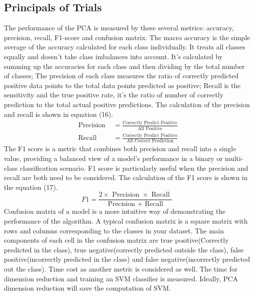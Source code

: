 \documentclass{cta-author}
\begin{document}
\subsection{Principals of Trials}
The performance of the PCA is measured by these several metrics: accuracy, precision, recall, F1-score and confusion matrix. 
The macro accuracy is the simple average of the accuracy calculated for each class individually. It treats all classes equally and doesn't take class imbalances into account. It's calculated by summing up the accuracies for each class and then dividing by the total number of classes; 
The precision of each class measures the ratio of correctly predicted positive data points to the total data points predicted as positive;
Recall is the sensitivity and the true positive rate, it's the ratio of number of correctly prediction to the total actual positive predictions.
The calculation of the precision and recall is shown in equation (16).
\begin{equation}
\begin{aligned}
\text { Precision } & =\frac{\text{Correctly Predict Positive}}{\text{All Positive}} \\
\text { Recall } & =\frac{\text{Correctly Predict Positive}}{\text{All Correct Prediction}}
\end{aligned}
\end{equation}
The F1 score is a metric that combines both precision and recall into a single value, providing a balanced view of a model's performance in a binary or multi-class classification scenario. F1 score is particularly useful when the precision and recall are both need to be considered. The calculation of the F1 score is shown in the equation (17).
\begin{equation}
F 1=\frac{2 \times \text { Precision } \times \text { Recall }}{\text { Precision }+ \text { Recall }}
\end{equation}
Confusion matrix of a model is a more intuitive way of demonstrating the performance of the algorithm. A typical confusion matrix is a square matrix with rows and columns corresponding to the classes in your dataset. The main components of each cell in the confusion matrix are true positive(Correctly predicted in the class), true negative(correctly predicted outside the class), false positive(incorrectly predicted in the class) and false negative(incorrectly predicted out the class).
Time cost as another metric is considered as well. The time for dimension reduction and training an SVM classifier is measured. Ideally, PCA dimension reduction will save the computation of SVM.
\end{document}
